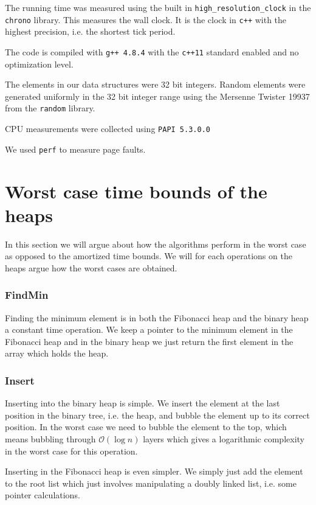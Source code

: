 \documentclass[a4paper,oneside,article,11pt]{memoir}
\begin{document}
The running time was measured using the built in \texttt{high\_resolution\_clock} in the \texttt{chrono} library. This measures the wall clock. It is the clock in \texttt{c++} with the highest precision, i.e. the shortest tick period.

The code is compiled with \texttt{g++ 4.8.4} with the \texttt{c++11} standard enabled and no optimization level.

The elements in our data structures were 32 bit integers. Random elements were generated uniformly in the 32 bit integer range using the Mersenne Twister 19937 from the \texttt{random} library.

CPU measurements were collected using \texttt{PAPI 5.3.0.0}

We used \texttt{perf} to measure page faults.


\chapter{Worst case time bounds of the heaps}
In this section we will argue about how the algorithms perform in the worst case as opposed to the amortized time bounds. We will for each operations on the heaps argue how the worst cases are obtained.

\subsection{FindMin}
Finding the minimum element is in both the Fibonacci heap and the binary heap a constant time operation. We keep a pointer to the minimum element in the Fibonacci heap and in the binary heap we just return the first element in the array which holds the heap.

\subsection{Insert}
Inserting into the binary heap is simple. We insert the element at the last position in the binary tree, i.e. the heap, and bubble the element up to its correct position. In the worst case we need to bubble the element to the top, which means bubbling through $\mathcal{O}(\log n)$ layers which gives a logarithmic complexity in the worst case for this operation.

Inserting in the Fibonacci heap is even simpler. We simply just add the element to the root list which just involves manipulating a doubly linked list, i.e. some pointer calculations. 
\end{document}
